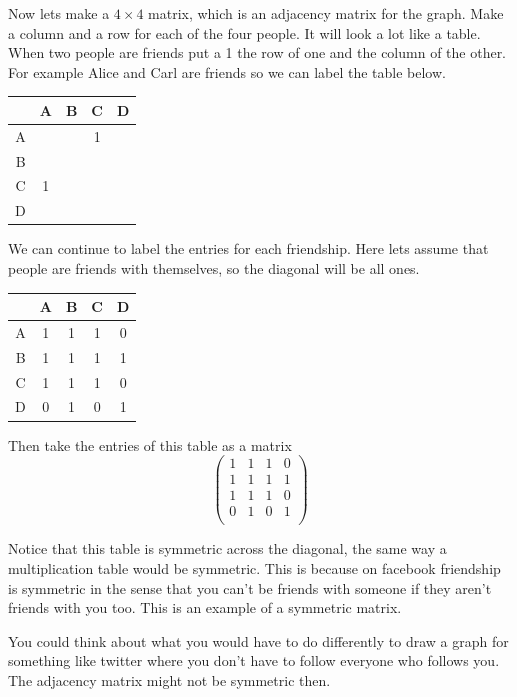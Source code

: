 {Now lets make a $4 \times 4$ matrix, which is an adjacency matrix for the graph. Make a column and a row for each of the four people. It will look a lot like a table. When two people are friends put a 1 the row of one and the column of the other. For example Alice and Carl are friends so we can label the table below.
\begin{center}
\begin{tabular}{r | c c c c}
 & A & B& C & D \\
 \hline
 A & & & 1 &  \\
 B & & & &  \\
 C & 1 & & &  \\
 D & & & &  \\
\end{tabular}
\end{center}

We can continue to label the entries for each friendship. Here lets assume that people are friends with themselves, so the diagonal will be all ones.

\begin{center}
\begin{tabular}{r | c c c c}
 & A & B& C & D \\
 \hline
 A &1 &1 &1 &0  \\
 B &1 &1 &1 &1  \\
 C &1 &1 &1 &0  \\
 D &0 &1 &0 &1  \\
\end{tabular}
\end{center}

Then take the entries of this table as a matrix
\[
\left(
\begin{array}{cccc}
1 &1 &1 &0  \\
1 &1 &1 &1  \\
1 &1 &1 &0  \\
0 &1 &0 &1  \\
\end{array} \right)
\]

Notice that this table is symmetric across the diagonal, the same way a multiplication table would be symmetric. This is because on facebook friendship is symmetric in the sense that you can't be friends with someone if they aren't friends with you too. This is an example of a symmetric matrix. 

You could think about what you would have to do differently to draw a graph for something like twitter where you don't have to follow everyone who follows you. The adjacency matrix might not be symmetric then. 


} %


